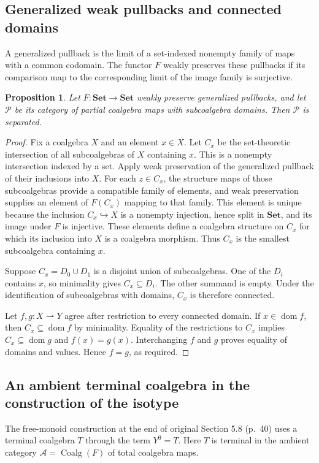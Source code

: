 \documentclass[11pt]{article}
\newtheorem{proposition}[theorem]{Proposition}
\newcommand{\dom}{\operatorname{dom}}\newcommand{\ran}{\operatorname{ran}}
\begin{document}
\subsection{Generalized weak pullbacks and connected domains}
A generalized pullback is the limit of a set-indexed nonempty family of maps with a common codomain. The functor $F$ weakly preserves these pullbacks if its comparison map to the corresponding limit of the image family is surjective.

\begin{proposition}\label{prop:generated-coalgebra-connected}
Let $F:\mathbf{Set}\to\mathbf{Set}$ weakly preserve generalized pullbacks, and let $\mathcal P$ be its category of partial coalgebra maps with subcoalgebra domains. Then $\mathcal P$ is separated.
\end{proposition}
\begin{proof}
Fix a coalgebra $X$ and an element $x\in X$. Let $C_x$ be the set-theoretic intersection of all subcoalgebras of $X$ containing $x$. This is a nonempty intersection indexed by a set. Apply weak preservation of the generalized pullback of their inclusions into $X$. For each $z\in C_x$, the structure maps of those subcoalgebras provide a compatible family of elements, and weak preservation supplies an element of $F(C_x)$ mapping to that family. This element is unique because the inclusion $C_x\hookrightarrow X$ is a nonempty injection, hence split in $\mathbf{Set}$, and its image under $F$ is injective. These elements define a coalgebra structure on $C_x$ for which its inclusion into $X$ is a coalgebra morphism. Thus $C_x$ is the smallest subcoalgebra containing $x$.

Suppose $C_x=D_0\cup D_1$ is a disjoint union of subcoalgebras. One of the $D_i$ contains $x$, so minimality gives $C_x\subseteq D_i$. The other summand is empty. Under the identification of subcoalgebras with domains, $C_x$ is therefore connected.

Let $f,g:X\rightharpoonup Y$ agree after restriction to every connected domain. If $x\in\dom f$, then $C_x\subseteq\dom f$ by minimality. Equality of the restrictions to $C_x$ implies $C_x\subseteq\dom g$ and $f(x)=g(x)$. Interchanging $f$ and $g$ proves equality of domains and values. Hence $f=g$, as required.
\end{proof}

\subsection{An ambient terminal coalgebra in the construction of the isotype}
The free-monoid construction at the end of original Section 5.8 (p.~40) uses a terminal coalgebra $T$ through the term $Y^0=T$. Here $T$ is terminal in the ambient category $\mathcal A=\operatorname{Coalg}(F)$ of total coalgebra maps.
\end{document}
